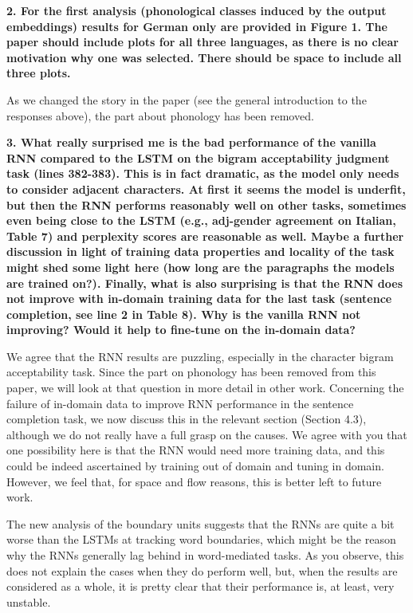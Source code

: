 \documentclass{article}[11pt,a4paper,oneside]
\begin{document}
\textbf{2. For the first analysis (phonological classes induced by the output embeddings) results for German only are provided in Figure 1. The paper should include plots for all three languages, as there is no clear motivation why one was selected. There should be space to include all three plots.}

As we changed the story in the paper (see the general introduction to the responses above), the part about phonology has been removed.
\newline

\textbf{3. What really surprised me is the bad performance of the vanilla RNN compared to the LSTM on the bigram acceptability judgment task (lines 382-383). This is in fact dramatic, as the model only needs to consider adjacent characters. At first it seems the model is underfit, but then the RNN performs reasonably well on other tasks, sometimes even being close to the LSTM (e.g., adj-gender agreement on Italian, Table 7) and perplexity scores are reasonable as well. Maybe a further discussion in light of training data properties and locality of the task might shed some light here (how long are the paragraphs the models are trained on?). Finally, what is also surprising is that the RNN does not improve with in-domain training data for the last task (sentence completion, see line 2 in Table 8). Why is the vanilla RNN not improving? Would it help to fine-tune on the in-domain data?}

We agree that the RNN results are puzzling, especially in the character bigram acceptability task. Since the part on phonology has been removed from this paper, we will look at that question in more detail in other work. Concerning the failure of in-domain data to improve RNN performance in the sentence completion task, we now discuss this in the relevant section (Section 4.3), although we do not really have a full grasp on the causes. We agree with you that one possibility here is that the RNN would need more training data, and this could be indeed ascertained by training out of domain and tuning in domain. However, we feel that, for space and flow reasons, this is better left to future work.

The new analysis of the boundary units suggests that the RNNs are quite a bit worse than the LSTMs at tracking word boundaries, which might be the reason why the RNNs generally lag behind in word-mediated tasks. As you observe, this does not explain the cases when they do perform well, but, when the results are considered as a whole, it is pretty clear that their performance is, at least, very unstable.
\end{document}
